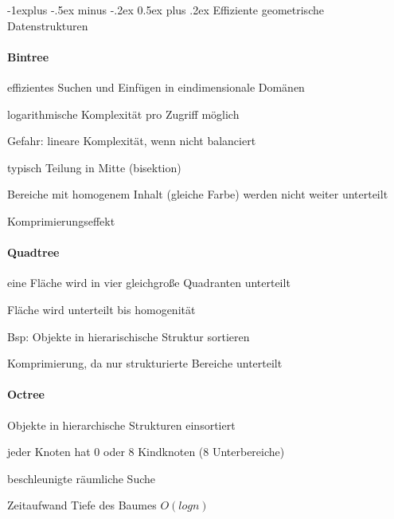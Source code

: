 \documentclass[landscape]{article}
\makeatletter
\renewcommand{\subsection}{\@startsection{subsection}{2}{0mm}%
                                {-1explus -.5ex minus -.2ex}%
                                {0.5ex plus .2ex}%
                                {\normalfont\normalsize\bfseries}}
\makeatother
\begin{document}
\begin{multicols}{3}
  \subsection{Effiziente geometrische Datenstrukturen}
  \paragraph{Bintree}
  \begin{itemize*}
    \item effizientes Suchen und Einfügen in eindimensionale Domänen
    \item logarithmische Komplexität pro Zugriff möglich
    \item Gefahr: lineare Komplexität, wenn nicht balanciert
    \item typisch Teilung in Mitte (bisektion)
    \item Bereiche mit homogenem Inhalt (gleiche Farbe) werden nicht weiter unterteilt
    \item Komprimierungseffekt
  \end{itemize*}
  
  \paragraph{Quadtree}
  \begin{itemize*}
    \item eine Fläche wird in vier gleichgroße Quadranten unterteilt
    \item Fläche wird unterteilt bis homogenität
    \item Bsp: Objekte in hierarischische Struktur sortieren
    \item Komprimierung, da nur strukturierte Bereiche unterteilt
  \end{itemize*}
  
  \paragraph{Octree}
  \begin{itemize*}
    \item Objekte in hierarchische Strukturen einsortiert
    \item jeder Knoten hat 0 oder 8 Kindknoten (8 Unterbereiche)
    \item beschleunigte räumliche Suche
    \item Zeitaufwand Tiefe des Baumes $O(log n)$
  \end{itemize*}
  

\end{multicols}
\end{document}
